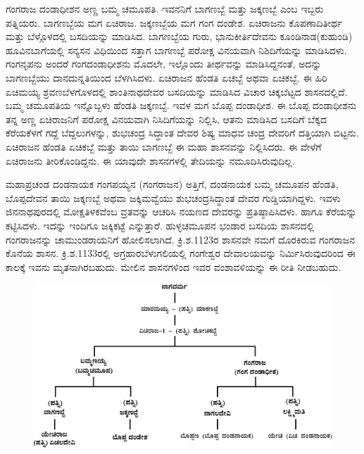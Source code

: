 ಗಂಗರಾಜ ದಂಡಾಧೀಶನ ಅಣ್ಣ ಬಮ್ಮ ಚಮೂಪತಿ. ಇವನನಿಗೆ ಬಾಗಣಬ್ಬೆ ಮತ್ತು ಜಕ್ಕಣಬ್ಬೆ ಎಂಬ ಇಬ್ಬರು ಪತ್ನಿಯರು. ಬಾಗಣಬ್ಬೆಯ ಮಗ ಏಚಿರಾಜ. ಜಕ್ಕಣಬ್ಬೆಯ ಮಗ ಗಂಗ ದಂಡೇಶ. ಏಚಿರಾಜನು ಕೊಪಣಾದಿತೀರ್ಥ ಮತ್ತು ಬೆಳ್ಗೊಳದಲ್ಲಿ ಬಸದಿಯನ್ನು ಮಾಡಿಸಿದ. ಬಾಗಣಬ್ಬೆಯ ಗುರು, ಭಾನುಕೀರ್ತಿದೇವನು ಕೂಂಡಿನಾಡ(ಕುಹುಂಡಿ) ಹೂವಿನಬಾಗೆಯಲ್ಲಿ ಸನ್ಯಸನ ವಿಧಿಯಿಂದ ಸತ್ತಾಗ ಬಾಗಣಬ್ಬೆ ಪರೋಕ್ಷ ವಿನಯವಾಗಿ ನಿಶಿದಿಗೆಯನ್ನು ಮಾಡಿಸಿದಳು. ಗಂಗನೃಪನು ಅಂದರೆ ಗಂಗದಂಡಾಧೀಶನು ಮೊದಲೇ, ಇಲ್ಲೊಂದು ತೀರ್ಥವನ್ನು ಮಾಡಿಸಿದ್ದನಂತೆ, ಅದನ್ನು ಬಾಗಣಬ್ಬೆಯು ದಾನದುನ್ನತಿಯಿಂದ ಬೆಳಗಿಸಿದಳು. ಏಚಿರಾಜನ ಹೆಂಡತಿ ಏಚಬ್ಬೆ ಅಥವಾ ಏಚಿಕಬ್ಬೆ. ಈ ಹಿರಿ ಏಚಿಮಯ್ಯ ಶ್ರವಣಬೆಳಗೊಳದಲ್ಲಿ ಶಾಂತಿನಾಥದೇವರ ಬಸದಿಯನ್ನು ಮಾಡಿಸಿದ ವಿಚಾರ ಚಿಕ್ಕಬೆಟ್ಟದ ಶಾಸನದಲ್ಲಿದೆ. ಬಮ್ಮ ಚಮೂಪತಿಯ ಇನ್ನೊಬ್ಬಳು ಹೆಂಡತಿ ಜಕ್ಕಣಬ್ಬೆ. ಇವಳ ಮಗ ಬೊಪ್ಪ ದಂಡಾಧೀಶ. ಈ ಬೊಪ್ಪ ದಂಡಾಧೀಶನು ತನ್ನ ಅಣ್ಣ ಏಚಿರಾಜನಿಗೆ ಪರೋಕ್ಷ ವಿನಯವಾಗಿ ನಿಸಿದಿಗೆಯನ್ನು ನಿಲ್ಲಿಸಿ, ಆತನು ಮಾಡಿಸಿದ ಬಸದಿಗೆ ಬೆಕ್ಕದ ಕೆರೆಯಕೆಳಗೆ ಗದ್ದೆ ಬೆದ್ದಲುಗಳನ್ನು, ಶುಭಚಂದ್ರ ಸಿದ್ಧಾಂತ ದೇವರ ಶಿಷ್ಯ ಮಾಧವ ಚಂದ್ರ ದೇವರಿಗೆ ದತ್ತಿಯಾಗಿ ಬಿಟ್ಟನು. ಏಚಿರಾಜನ ಹೆಂಡತಿ ಏಚಿಕಬ್ಬೆ ಮತ್ತು ತಾಯಿ ಬಾಗಣಬ್ಬೆ ಈ ಮಹಾ ಶಾಸನವನ್ನು ನಿಲ್ಲಿಸಿದರು. ಈ ವೇಳೆಗೆ ಏಚಿರಾಜನು ತೀರಿಕೊಂಡಿದ್ದನು. ಈ ಯಾವುದೇ ಶಾಸನಗಳಲ್ಲಿ ತೇದಿಯನ್ನು ನಮೂದಿಸಿರುವುದಿಲ್ಲ.

ಮಹಾಪ್ರಚಂಡ ದಂಡನಾಯಕ ಗಂಗಪಯ್ಯನ (ಗಂಗರಾಜನ) ಅತ್ತಿಗೆ, ದಂಡನಾಯಕ ಬಮ್ಮ ಚಮೂಪನ ಹೆಂಡತಿ, ಬೊಪ್ಪದೇವನ ತಾಯಿ ಜಕ್ಕಣಬ್ಬೆ ಅಥವಾ ಜಕ್ಕಿಮವ್ವೆಯು ಶುಭಚಂದ್ರಸಿದ್ಧಾಂತ ದೇವರ ಗುಡ್ಡಿಯಾಗಿದ್ದಳು. ಇವಳು ಜಿನನಾಥಪುರದಲ್ಲಿ ಮೋಕ್ಷತಿಳಕವೆಂಬ ವ್ರತವನ್ನು ಆಚರಿಸಿ ನಯಣದ ದೇವರನ್ನು ಪ್ರತಿಷ್ಠಾಪಿಸಿದಳು. ಹಾಗೂ ಕೆರೆಯನ್ನು ಕಟ್ಟಿಸಿದಳು. ಇದನ್ನು ಇಂದಿಗೂ ಜಕ್ಕಿಕಟ್ಟೆ ಎನ್ನುತ್ತಾರೆ. ಹುಳ್ಳಚಮೂಪನ ಭಂಡಾರ ಬಸದಿಯ ಶಾಸನದಲ್ಲಿ ಗಂಗರಾಜನನ್ನು ಚಾಮುಂಡರಾಯನಿಗೆ ಹೋಲಿಸಲಾಗಿದೆ. ಕ್ರಿ.ಶ.1123ರ ಶಾಸನವೇ ನಮಗೆ ದೊರಕಿರುವ ಗಂಗರಾಜನ ಕೊನೆಯ ಶಾಸನ. ಕ್ರಿ.ಶ.1133ರಲ್ಲಿ ಅಗ್ರಹಾರಬೆಳುಗಲಿಯಲ್ಲಿ ಗಂಗೇಶ್ವರ ದೇವಾಲಯವನ್ನು ನಿರ್ಮಿಸಿರುವುದರಿಂದ ಈ ಕಾಲಕ್ಕೆ ಇವನು ಮೃತನಾಗಿರಬಹುದು. ಮೇಲಿನ ಶಾಸನಗಳಿಂದ ಇವರ ವಂಶಾವಳಿಯನ್ನು ಈ ರೀತಿ ನೀಡಬಹುದು.

\begin{figure}[H]
\includegraphics[scale=1.1]{images/chap3/chap3fig11.jpeg}
\end{figure}

